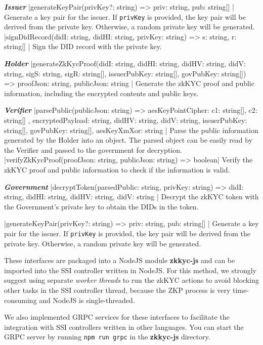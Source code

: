 \documentclass[
]{report}
\begin{document}
\textit{\textbf{Issuer}}
|generateKeyPair(privKey?: string) => { priv: string, pub: string[] }|
Generate a key pair for the issuer. If \texttt{privKey} is provided,
the key pair will be derived from the private key. Otherwise, a random
private key will be generated.
|signDidRecord(didI: string, didHI: string, privKey: string) => { s: string, r: string[] }|
Sign the DID record with the private key.

\textit{\textbf{Holder}}
|generateZkKycProof(didI: string, didHI: string, didHV: string, didV: string, sigS: string, sigR: string[], issuerPubKey: string{[}{]}, govPubKey: string{[}{]}) => { proofJson: string, publicJson: string }|
Generate the zkKYC proof and public information, including the
encrypted contents and public keys.

\textit{\textbf{Verifier}}
|parsePublic(publicJson: string) => { aesKeyPointCipher: { c1: string[], c2: string[] }, encryptedPayload: string, didHV: string, didV: string, issuerPubKey: string[], govPubKey: string[], aesKeyXmXor: string }|
Parse the public information generated by the Holder into an object.
The parsed object can be easily read by the Verifier and passed to the
government for decryption.
|verifyZkKycProof(proofJson: string, publicJson: string) => boolean|
Verify the zkKYC proof and public information to check if the information is valid.

\textit{\textbf{Government}}
|decryptToken(parsedPublic: string, privKey: string) => { didI: string, didHI: string, didHV: string, didV: string }|
Decrypt the zkKYC token with the Government's private key to obtain
the DIDs in the token.

|generateKeyPair(privKey?: string) => { priv: string, pub: string[] }|
Generate a key pair for the issuer. If \texttt{privKey} is provided,
the key pair will be derived from the private key. Otherwise, a random
private key will be generated.

These interfaces are packaged into a NodeJS module \textbf{zkkyc-js} and
can be imported into the SSI controller written in NodeJS. For this
method, we strongly suggest using separate \emph{worker threads} to run
the zkKYC actions to avoid blocking other tasks in the SSI controller
thread, because the ZKP process is very time-consuming and NodeJS is
single-threaded.

We also implemented GRPC services for these interfaces to facilitate the
integration with SSI controllers written in other languages. You can
start the GRPC server by running \texttt{npm\ run\ grpc} in the
\textbf{zkkyc-js} directory.
\end{document}
